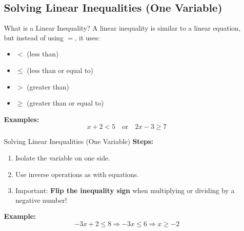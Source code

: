 \documentclass{beamer}
\begin{document}
\begin{frame}
\section{Solving Linear Inequalities (One Variable)}

\end{frame}
\begin{frame}{What is a Linear Inequality?}
    A linear inequality is similar to a linear equation, but instead of using $=$, it uses:
    \begin{itemize}
        \item $<$ (less than)
        \item $\le$ (less than or equal to)
        \item $>$ (greater than)
        \item $\ge$ (greater than or equal to)
    \end{itemize}

    \vspace{0.5cm}
    \textbf{Examples:}
    \[
    x + 2 < 5 \quad \text{or} \quad 2x - 3 \ge 7
    \]
    
\end{frame}

\begin{frame}{Solving Linear Inequalities (One Variable)}
    \textbf{Steps:}
    \begin{enumerate}
        \item Isolate the variable on one side.
        \item Use inverse operations as with equations.
        \item Important: \textbf{Flip the inequality sign} when multiplying or dividing by a negative number!
    \end{enumerate}

    \vspace{0.5cm}
    \textbf{Example:}
    \[
    -3x + 2 \le 8 \Rightarrow -3x \le 6 \Rightarrow x \ge -2
    \]
\end{frame}
\end{document}
